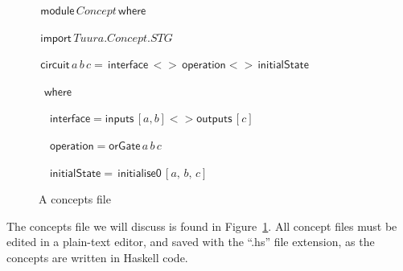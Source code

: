 \documentclass[british,conference,compsoc]{IEEEtran}
\begin{document}
\begin{figure}[H]
\begin{centering}

\begin{flushleft}
$\,\mathsf{module}\, Concept \, \mathsf{where}$
\par\end{flushleft}

\begin{flushleft}
$\,\mathsf{import}\, Tuura.Concept.STG$
\par\end{flushleft}

\begin{flushleft}
$\,\mathsf{circuit}\,a \,b \,c=\mathsf{\,interface}\,<> \mathsf{\, operation}
<>\,\mathsf{initialState}$

$\,\,\,\mathsf{where}$
\par\end{flushleft}

\begin{flushleft}
$\,\,\,\,\,\,\mathsf{interface}=\mathsf{inputs}\,[a,b]<>\mathsf{outputs}\,[c]$
\par\end{flushleft}

\begin{flushleft}
$\,\,\,\,\,\,\mathsf{operation}= \mathsf{orGate}\,a\,b\,c$
\par\end{flushleft}

\begin{flushleft}
$\,\,\,\,\,\,\mathsf{initialState}= \, \mathsf{initialise0}\,[a,\,b,\,c]$
\par\end{flushleft}

\par\end{centering}
\vspace{-2mm}
\begin{centering}
\protect\caption{\label{fig:concepts_file}A concepts file}
\vspace{-2mm}
\par\end{centering}

\end{figure}

The concepts file we will discuss is found in Figure~\ref{fig:concepts_file}.
All concept files must be edited in a plain-text editor, and saved with the 
``.hs'' file extension, as the concepts are written in Haskell code. 
\end{document}
